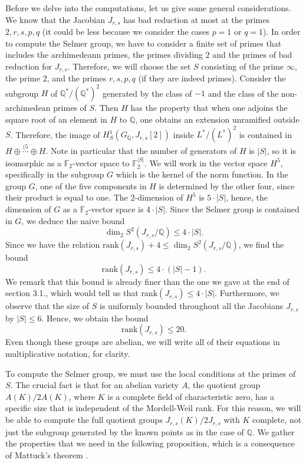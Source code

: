 \documentclass[a4paper, 12pt]{amsart}
\theoremstyle{definition}
\theoremstyle{plain}
\theoremstyle{plain}
\theoremstyle{plain}
\theoremstyle{plain}
\theoremstyle{remark}
\theoremstyle{remark}
\theoremstyle{plain}
\newcommand{\Q}{\mathbb{Q}}
\newcommand{\GF}[1]{\mathbb{F}_{#1}}
\begin{document}
	Before we delve into the computations, let us give some general considerations. We know that the Jacobian $J_{r,s}$ has bad reduction at most at the primes $2,r,s,p,q$ (it could be less because we consider the cases $p=1$ or $q=1$). In order to compute the Selmer group, we have to consider a finite set of primes that includes the archimedeann primes, the primes dividing $2$ and the primes of bad reduction for $J_{r,s}$. Therefore, we will choose the set $S$ consisting of the prime $\infty$, the prime $2$, and the primes $r,s,p,q$ (if they are indeed primes). Consider the subgroup $H$ of $\Q^*/(\Q^*)^2$ generated by the class of $-1$ and the class of the non-archimedean primes of $S$. Then $H$ has the property that when one adjoins the square root of an element in $H$ to $\Q$, one obtains an extension unramified outside $S$. Therefore, the image of $H^1_S(G_\Q,J_{r,s}[2])$ inside $L^*/(L^*)^2$ is contained in $H\oplus\overset{(5}{\cdots}\oplus H$. Note in particular that the number of generators of $H$ is $|S|$, so it is isomorphic as a $\GF{2}$-vector space to $\GF{2}^{|S|}$. We will work in the vector space $H^5$, specifically in the subgroup $G$ which is the kernel of the norm function. In the group $G$, one of the five components in $H$ is determined by the other four, since their product is equal to one. The 2-dimension of $H^5$ is $5\cdot|S|$, hence, the dimension of $G$ as a $\GF{2}$-vector space is $4\cdot|S|$. Since the Selmer group is contained in $G$, we deduce the naive bound
	\begin{equation*}
		\dim_2 S^2(J_{r,s}/\Q)\le 4\cdot|S|.
	\end{equation*}
	Since we have the relation $\text{rank}(J_{r,s})+4\le \dim_2S^2(J_{r,s}/\Q)$, we find the bound
	\begin{equation*}
		\text{rank}(J_{r,s})\le 4\cdot(|S|-1).
	\end{equation*}
	We remark that this bound is already finer than the one we gave at the end of section 3.1., which would tell us that $\text{rank}(J_{r,s})\le 4\cdot|S|$. Furthermore, we observe that the size of $S$ is uniformly bounded throughout all the Jacobians $J_{r,s}$ by $|S|\le 6$. Hence, we obtain the bound
	\begin{equation*}
		\text{rank}(J_{r,s})\le 20.
	\end{equation*}
	Even though these groups are abelian, we will write all of their equations in multiplicative notation, for clarity.
	
	To compute the Selmer group, we must use the local conditions at the primes of $S$. The crucial fact is that for an abelian variety $A$, the quotient group $A(K)/2A(K)$, where $K$ is a complete field of characteristic zero, has a specific size that is independent of the Mordell-Weil rank. For this reason, we will be able to compute the full quotient groups $J_{r,s}(K)/2J_{r,s}$ with $K$ complete, not just the subgroup generated by the known points as in the case of $\Q$. We gather the properties that we need in the following proposition, which is a consequence of Mattuck's theorem \cite{Mattuck_1955}.
	
\end{document}
